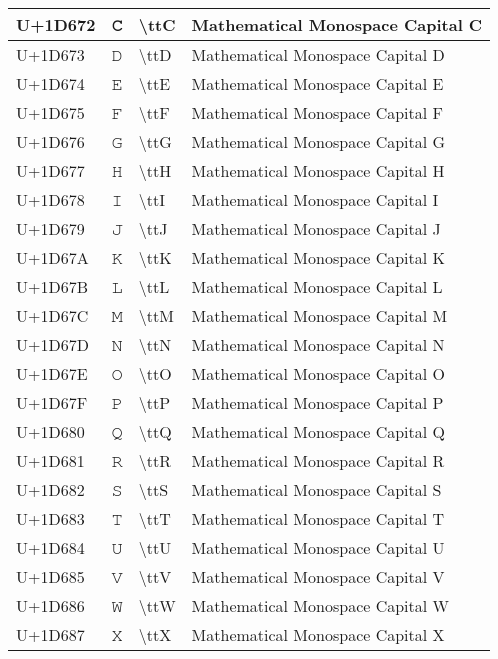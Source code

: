 \begin{table}[h]
\begin{tabulary}{\linewidth}{|L|L|L|L|}
\hline
U+1D672 & 𝙲 & {\textbackslash}ttC & Mathematical Monospace Capital C \\
\hline
U+1D673 & 𝙳 & {\textbackslash}ttD & Mathematical Monospace Capital D \\
\hline
U+1D674 & 𝙴 & {\textbackslash}ttE & Mathematical Monospace Capital E \\
\hline
U+1D675 & 𝙵 & {\textbackslash}ttF & Mathematical Monospace Capital F \\
\hline
U+1D676 & 𝙶 & {\textbackslash}ttG & Mathematical Monospace Capital G \\
\hline
U+1D677 & 𝙷 & {\textbackslash}ttH & Mathematical Monospace Capital H \\
\hline
U+1D678 & 𝙸 & {\textbackslash}ttI & Mathematical Monospace Capital I \\
\hline
U+1D679 & 𝙹 & {\textbackslash}ttJ & Mathematical Monospace Capital J \\
\hline
U+1D67A & 𝙺 & {\textbackslash}ttK & Mathematical Monospace Capital K \\
\hline
U+1D67B & 𝙻 & {\textbackslash}ttL & Mathematical Monospace Capital L \\
\hline
U+1D67C & 𝙼 & {\textbackslash}ttM & Mathematical Monospace Capital M \\
\hline
U+1D67D & 𝙽 & {\textbackslash}ttN & Mathematical Monospace Capital N \\
\hline
U+1D67E & 𝙾 & {\textbackslash}ttO & Mathematical Monospace Capital O \\
\hline
U+1D67F & 𝙿 & {\textbackslash}ttP & Mathematical Monospace Capital P \\
\hline
U+1D680 & 𝚀 & {\textbackslash}ttQ & Mathematical Monospace Capital Q \\
\hline
U+1D681 & 𝚁 & {\textbackslash}ttR & Mathematical Monospace Capital R \\
\hline
U+1D682 & 𝚂 & {\textbackslash}ttS & Mathematical Monospace Capital S \\
\hline
U+1D683 & 𝚃 & {\textbackslash}ttT & Mathematical Monospace Capital T \\
\hline
U+1D684 & 𝚄 & {\textbackslash}ttU & Mathematical Monospace Capital U \\
\hline
U+1D685 & 𝚅 & {\textbackslash}ttV & Mathematical Monospace Capital V \\
\hline
U+1D686 & 𝚆 & {\textbackslash}ttW & Mathematical Monospace Capital W \\
\hline
U+1D687 & 𝚇 & {\textbackslash}ttX & Mathematical Monospace Capital X \\

\end{tabulary}
\end{table}
